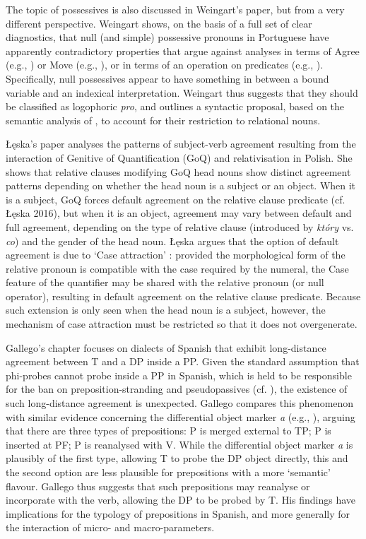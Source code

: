 \documentclass[output=paper]{langsci/langscibook}
\begin{document}
The topic of possessives is also discussed in Weingart’s paper, but from a very different perspective. Weingart shows, on the basis of a full set of clear diagnostics, that null (and simple) possessive pronouns in Portuguese have apparently contradictory properties that argue against analyses in terms of Agree (e.g., \citealt{Hicks2009}) or Move (e.g., \citealt{Floripi2009,Rodrigues2010}), or in terms of an operation on predicates (e.g., \citealt{Reinhart2006}). Specifically, null possessives appear to have something in between a bound variable and an indexical interpretation. Weingart thus suggests that they should be classified as logophoric \textit{pro}, and outlines a syntactic proposal, based on the semantic analysis of \citet{Partee1997}, to account for their restriction to relational nouns.

Łęska’s paper analyses the patterns of subject-verb agreement resulting from the interaction of Genitive of Quantification (GoQ) and relativisation in Polish. She shows that relative clauses modifying GoQ head nouns show distinct agreement patterns depending on whether the head noun is a subject or an object. When it is a subject, GoQ forces default agreement on the relative clause predicate (cf. Łęska 2016), but when it is an object, agreement may vary between default and full agreement, depending on the type of relative clause (introduced by \textit{który} vs. \textit{co}) and the gender of the head noun. Łęska argues that the option of default agreement is due to ‘Case attraction’ \citep{Bader2006}: provided the morphological form of the relative pronoun is compatible with the case required by the numeral, the Case feature of the quantifier may be shared with the relative pronoun (or null operator), resulting in default agreement on the relative clause predicate. Because such extension is only seen when the head noun is a subject, however, the mechanism of case attraction must be restricted so that it does not overgenerate.

Gallego’s chapter focuses on dialects of Spanish that exhibit long-distance agreement between T and a DP inside a PP. Given the standard assumption that phi-probes cannot probe inside a PP in Spanish, which is held to be responsible for the ban on preposition-stranding and pseudopassives (cf. \citealt{Law2006}), the existence of such long-distance agreement is unexpected. Gallego compares this phenomenon with similar evidence concerning the differential object marker \textit{a} (e.g., \citealt{Torrego1998,López2012}), arguing that there are three types of prepositions: P is merged external to TP; P is inserted at PF; P is reanalysed with V. While the differential object marker \textit{a} is plausibly of the first type, allowing T to probe the DP object directly, this and the second option are less plausible for prepositions with a more ‘semantic’ flavour. Gallego thus suggests that such prepositions may reanalyse or incorporate with the verb, allowing the DP to be probed by T. His findings have implications for the typology of prepositions in Spanish, and more generally for the interaction of micro- and macro-parameters.
\end{document}
